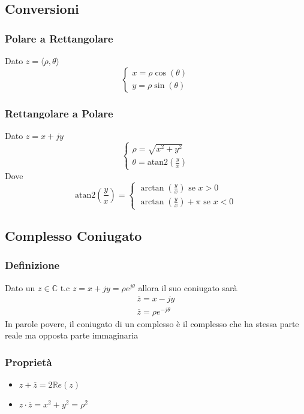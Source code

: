 \subsection{Conversioni}
\subsubsection{Polare a Rettangolare}
Dato $z = \langle\rho, \theta\rangle $
\begin{equation}
    \begin{cases}
        x = \rho\cos\left(\theta\right)\\
        y = \rho\sin\left(\theta\right)
    \end{cases}
\end{equation}

\subsubsection{Rettangolare a Polare}
Dato $z = x + jy$
\begin{equation}
    \begin{cases}
        \rho = \sqrt{x^2 + y^2}\\
        \theta = \text{atan2}\left(\frac{y}{x}\right)
    \end{cases}
\end{equation}
Dove
\begin{equation}
    \text{atan2}\left(\frac{y}{x}\right) = \begin{cases}
        \arctan\left(\frac{y}{x}\right) \text{ se } x > 0 \\
        \arctan\left(\frac{y}{x}\right) + \pi \text{ se } x < 0
    \end{cases}
\end{equation}

\subsection{Complesso Coniugato}
\subsubsection{Definizione}
Dato un $z \in \mathbb{C}$ t.c $z = x + jy = \rho e^{j\theta}$ allora il suo coniugato sarà
\begin{eqnarray}
    \overline{z} =  x - jy \\
    \overline{z} = \rho e^{-j\theta}
\end{eqnarray}
In parole povere, il coniugato di un complesso è il complesso che ha stessa parte reale ma opposta parte immaginaria
\subsubsection{Proprietà}
\begin{itemize}
    \item $\displaystyle z + \overline{z} = 2 \mathbb{R}e(z)$
    \item $z \cdot \overline{z} = x^2 + y^2 = \rho^2$
\end{itemize}